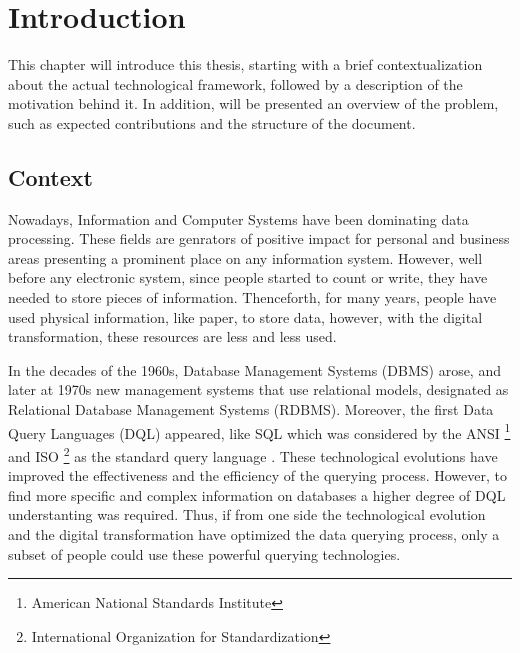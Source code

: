 \newcommand{\novathesis}{\emph{novathesis}}
\newcommand{\novathesisclass}{\texttt{novathesis.cls}}


\chapter{Introduction}
\label{cha:introduction}
This chapter will introduce this thesis, starting with a brief contextualization about the actual technological framework, followed by a description of the motivation behind it. In addition, will be presented an overview of the problem, such as expected contributions and the structure of the document. 

\section{Context} 
\label{sec:context}
Nowadays, Information and Computer Systems have been dominating data processing. These fields are genrators of positive impact for personal and business areas presenting a prominent place on any information system. However, well before any electronic system, since people started to count or write, they have needed to store pieces of information. \cite{historyOfDatabases} Thenceforth, for many years, people have used physical information, like paper, to store data, however, with the digital transformation, these resources are less and less used.

In the decades of the 1960s, Database Management Systems (DBMS) arose, and later at 1970s new management systems that use relational models, designated as Relational Database Management Systems (RDBMS). Moreover, the first Data Query Languages (DQL) appeared, like SQL \cite{sequel_aStructuredEnglishQueryLanguage} which was considered by the ANSI \footnote{American National Standards Institute} and ISO \footnote{International Organization for Standardization} as the standard query language \cite{databaseManagementSystems}. These technological evolutions have improved the effectiveness and the efficiency of the querying process. However, to find more specific and complex information on databases  a higher degree of DQL understanting was required. Thus, if from one side the technological evolution and the digital transformation have optimized the data querying process, only a subset of people could use these powerful querying technologies.

